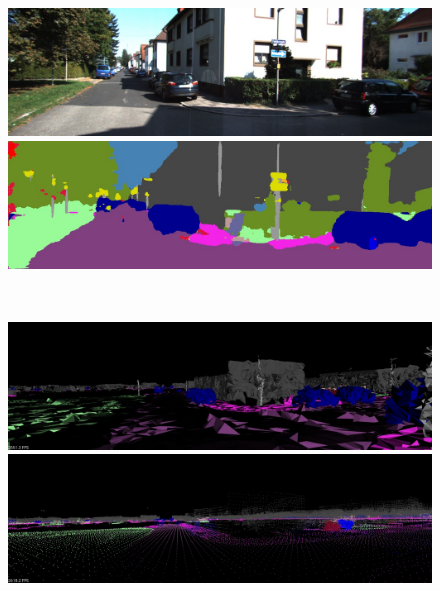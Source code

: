 \begin{figure}[htbp]
 \begin{minipage}[b]{0.50\hsize}
 \begin{center}
  \includegraphics[keepaspectratio, scale=0.18]{./picture/bgrimage/bgrimage6.jpg}
  \end{center}
 \end{minipage}
 \begin{minipage}[b]{0.5\hsize}
 \begin{center}
  \includegraphics[keepaspectratio, scale=0.18]{./picture/segimage/image6.jpg}
  \end{center}
 \end{minipage} \\
 \begin{minipage}[b]{0.50\hsize}
 \begin{center}
  \includegraphics[keepaspectratio, scale=0.18]{./picture/mesh_map_image/image6.jpg}
  \end{center}
 \end{minipage}
 \begin{minipage}[b]{0.50\hsize}
 \begin{center}
  \includegraphics[keepaspectratio, scale=0.18]{./picture/point_map_image/image6.jpg}

\end{center}
\end{minipage}
\end{figure}
